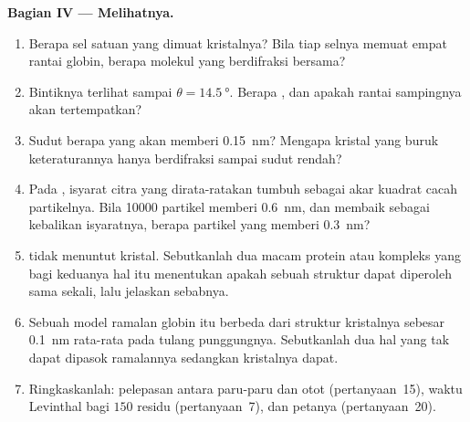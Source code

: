 \begin{problem}
\medskip
\noindent\textbf{Bagian IV --- Melihatnya.}
\begin{enumerate}[resume]
  \item Berapa sel satuan yang dimuat kristalnya? Bila tiap selnya
        memuat empat rantai globin, berapa molekul yang berdifraksi bersama?
  \item Bintiknya terlihat sampai $\theta = \qty{14.5}{\degree}$. Berapa
        , dan apakah rantai sampingnya akan tertempatkan?
  \item Sudut berapa yang akan memberi \qty{0.15}{nm}? Mengapa kristal yang
        buruk keteraturannya hanya berdifraksi sampai sudut rendah?
  \item Pada , isyarat citra yang dirata-ratakan
        tumbuh sebagai akar kuadrat cacah partikelnya. Bila
        \num{10000} partikel memberi \qty{0.6}{nm}, dan 
        membaik sebagai kebalikan isyaratnya, berapa partikel yang
        memberi \qty{0.3}{nm}?
  \item {} tidak menuntut kristal. Sebutkanlah dua
        macam protein atau kompleks yang bagi keduanya hal itu menentukan
        apakah sebuah struktur dapat diperoleh sama sekali, lalu jelaskan
        sebabnya.
  \item Sebuah model ramalan globin itu berbeda dari struktur kristalnya
        sebesar \qty{0.1}{nm} rata-rata pada tulang punggungnya. Sebutkanlah
        dua hal yang tak dapat dipasok ramalannya sedangkan kristalnya dapat.
  \item Ringkaskanlah: pelepasan antara paru-paru dan otot (pertanyaan~15),
        waktu Levinthal bagi $150$ residu (pertanyaan~7), dan
         petanya (pertanyaan~20).
\end{enumerate}
\end{problem}
